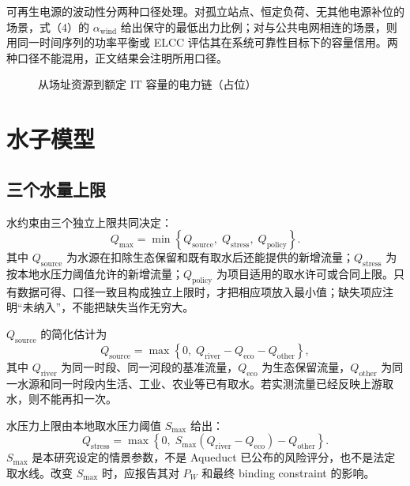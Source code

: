 \documentclass{mcmthesis}
\begin{document}
可再生电源的波动性分两种口径处理。对孤立站点、恒定负荷、无其他电源补位的场景，式（4）的 \(\alpha_{\mathrm{wind}}\) 给出保守的最低出力比例；对与公共电网相连的场景，则用同一时间序列的功率平衡或 ELCC 评估其在系统可靠性目标下的容量信用。两种口径不能混用，正文结果会注明所用口径。

\begin{figure}[H]
\centering
{}
\caption{从场址资源到额定 IT 容量的电力链（占位）}
\label{fig:power}
\end{figure}

\section{水子模型}
\label{sec:water}

\subsection{三个水量上限}

水约束由三个独立上限共同决定：
\begin{equation}
Q_{\max}=\min\left\{Q_{\mathrm{source}},\;Q_{\mathrm{stress}},\;Q_{\mathrm{policy}}\right\}.
\tag{8}
\end{equation}
其中 \(Q_{\mathrm{source}}\) 为水源在扣除生态保留和既有取水后还能提供的新增流量；\(Q_{\mathrm{stress}}\) 为按本地水压力阈值允许的新增流量；\(Q_{\mathrm{policy}}\) 为项目适用的取水许可或合同上限。只有数据可得、口径一致且构成独立上限时，才把相应项放入最小值；缺失项应注明“未纳入”，不能把缺失当作无穷大。

\(Q_{\mathrm{source}}\) 的简化估计为
\begin{equation}
Q_{\mathrm{source}}=\max\left\{0,\;Q_{\mathrm{river}}-Q_{\mathrm{eco}}-Q_{\mathrm{other}}\right\},
\tag{9}
\end{equation}
其中 \(Q_{\mathrm{river}}\) 为同一时段、同一河段的基准流量，\(Q_{\mathrm{eco}}\) 为生态保留流量，\(Q_{\mathrm{other}}\) 为同一水源和同一时段内生活、工业、农业等已有取水。若实测流量已经反映上游取水，则不能再扣一次。

水压力上限由本地取水压力阈值 \(S_{\max}\) 给出：
\begin{equation}
Q_{\mathrm{stress}}=\max\left\{0,\;S_{\max}\left(Q_{\mathrm{river}}-Q_{\mathrm{eco}}\right)-Q_{\mathrm{other}}\right\}.
\tag{10}
\end{equation}
\(S_{\max}\) 是本研究设定的情景参数，不是 Aqueduct 已公布的风险评分，也不是法定取水线。改变 \(S_{\max}\) 时，应报告其对 \(P_W\) 和最终 binding constraint 的影响。
\end{document}
